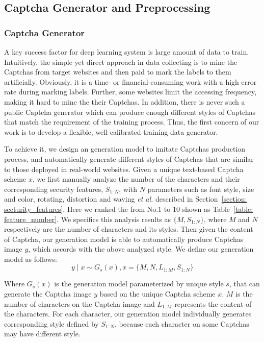 \subsection{Captcha Generator and Preprocessing} \label{section: Captcha_generator}
\subsubsection{Captcha Generator}
A key success factor for deep learning system is large amount of data to train.
Intuitively, the simple yet direct approach in data collecting is to mine the Captchas from target websites and then paid to mark the labels to them artificially. Obviously, it is a time- or financial-consuming work with a high error rate during marking labels. 
Further, some websites limit the accessing frequency, making it hard to mine the their Captchas.
In addition, there is never such a public Captcha generator which can produce enough different styles of Captchas that match the requirement of the training process.
Thus, the first concern of our work is to develop a flexible, well-calibrated training data generator.

To achieve it, we design an generation model to imitate Captchas production process, and automatically generate different styles of Captchas that are similar to those deployed in real-world websites.
Given a unique text-based Captcha scheme $x$, we first manually analyze the number of the characters and their corresponding security features, $S_{1:N}$, with $N$ parameters such as font style, size and color, rotating, distortion and waving \emph{et al.} described in Section~\ref{section: sccturity_features}.
Here we ranked the from No.1 to 10 shown as Table~\ref{table: feature_number}.
We specifics this analysis results as $\{ M, S_{1:N} \}$, where $M$ and $N$ respectively are the number of characters and its styles.
Then given the content of Captcha, our generation model is able to automatically produce Captchas image $y$, which accords with the above analyzed style.
We define our generation model as follows:
\begin{equation}\label{equation: generator_model}
  y \mid x \sim G_s(x),    x = \{M, N, L_{1:M}, S_{1:N} \}
\end{equation}

Where $G_s(x)$ is the generation model parameterized by unique style $s$, that can generate the Captcha image $y$ based on the unique Captcha scheme $x$. $M$ is the number of characters on the Captcha image and $L_{1:M}$ represents the content of the characters. For each character, our generation model individually generates corresponding style defined by $S_{1:N}$, because each character on some Captchas may have different style.


